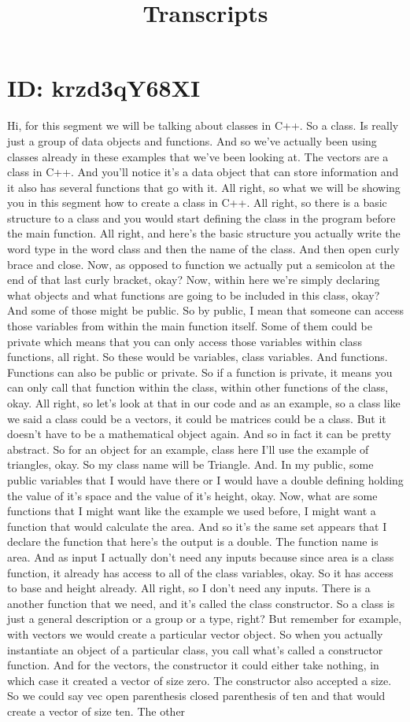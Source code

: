 \documentclass[10pt]{article}
\title{Transcripts}
\date{}
\begin{document}
\section*{ID: krzd3qY68XI}
Hi, for this segment we will be talking about classes in C++. So a class. Is really just a group of data objects and functions. And so we've actually been using classes already in these examples that we've been looking at. The vectors are a class in C++. And you'll notice it's a data object that can store information and it also has several functions that go with it. All right, so what we will be showing you in this segment how to create a class in C++. All right, so there is a basic structure to a class and you would start defining the class in the program before the main function. All right, and here's the basic structure you actually write the word type in the word class and then the name of the class. And then open curly brace and close. Now, as opposed to function we actually put a semicolon at the end of that last curly bracket, okay? Now, within here we're simply declaring what objects and what functions are going to be included in this class, okay? And some of those might be public. So by public, I mean that someone can access those variables from within the main function itself. Some of them could be private which means that you can only access those variables within class functions, all right. So these would be variables, class variables. And functions. Functions can also be public or private. So if a function is private, it means you can only call that function within the class, within other functions of the class, okay. All right, so let's look at that in our code and as an example, so a class like we said a class could be a vectors, it could be matrices could be a class. But it doesn't have to be a mathematical object again. And so in fact it can be pretty abstract. So for an object for an example, class here I'll use the example of triangles, okay. So my class name will be Triangle. And. In my public, some public variables that I would have there or I would have a double defining holding the value of it's space and the value of it's height, okay. Now, what are some functions that I might want like the example we used before, I might want a function that would calculate the area. And so it's the same set appears that I declare the function that here's the output is a double. The function name is area. And as input I actually don't need any inputs because since area is a class function, it already has access to all of the class variables, okay. So it has access to base and height already. All right, so I don't need any inputs. There is a another function that we need, and it's called the class constructor. So a class is just a general description or a group or a type, right? But remember for example, with vectors we would create a particular vector object. So when you actually instantiate an object of a particular class, you call what's called a constructor function. And for the vectors, the constructor it could either take nothing, in which case it created a vector of size zero. The constructor also accepted a size. So we could say vec open parenthesis closed parenthesis of ten and that would create a vector of size ten. The other 
\end{document}
